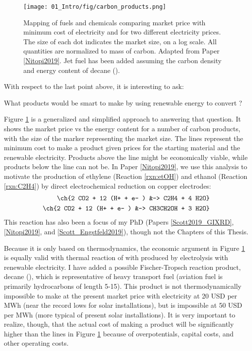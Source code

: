 \begin{figure}[h!]
	\centering
	\texttt{[image: 01\_Intro/fig/carbon\_products.png]}
	\caption{Mapping of fuels and chemicals comparing market price with minimum cost of electricity and  for two different electricity prices. The size of each dot indicates the market size, on a log scale. All quantities are normalized to mass of carbon. Adapted from Paper \ref{Nitopi2019}. Jet fuel has been added assuming the carbon density and energy content of decane ().}
	\label{fig:products}
\end{figure}

With respect to the last point above, it is interesting to ask: 
\begin{question}
	What products would be smart to make by using renewable energy to convert ?
\end{question}
Figure \ref{fig:products} is a generalized and simplified approach to answering that question. It shows the market price vs the energy content for a number of carbon products, with the size of the marker representing the market size. The lines represent the minimum cost to make a product given prices for the  starting material and the renewable electricity. Products above the line might be economically viable, while products below the line can not be. In Paper \ref{Nitopi2019}, we use this analysis to motivate the production of ethylene (Reaction \ref{rxn:etOH}) and ethanol (Reaction \ref{rxn:C2H4}) by direct electrochemical  reduction on copper electrodes:
\begin{align}
\ch{2 CO2 + 12 (H+ + e- ) &-> C2H4 + 4 H2O}\label{rxn:etOH}\\
\ch{2 CO2 + 12 (H+ + e- ) &-> CH3CH2OH + 3 H2O}\label{rxn:C2H4}
\end{align}
This reaction has also been a focus of my PhD (Papers \ref{Scott2019_GIXRD}, \ref{Nitopi2019}, and \ref{Scott_Engstfeld2019}), though not the Chapters of this Thesis.

Because it is only based on thermodynamics, the economic argument in Figure \ref{fig:products} is equally valid with thermal reaction of  with  produced by electrolysis with renewable electricity. I have added a possible Fischer-Tropsch reaction product, decane (), which is representative of heavy transport fuel (aviation fuel is primarily hydrocarbons of length 5-15). This product is not thermodynamically impossible to make at the present market price with electricity at 20 USD per MWh (near the record lows for solar installations), but is impossible at 50 USD per MWh (more typical of present solar installations). It is very important to realize, though, that the actual cost of making a product will be significantly higher than the lines in Figure \ref{fig:products} because of overpotentials, capital costs, and other operating costs.

